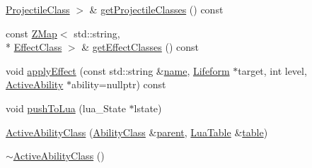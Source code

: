 \begin{DoxyCompactItemize}
\hyperlink{classZeta_1_1ProjectileClass}{Projectile\+Class} $>$ \& \hyperlink{classZeta_1_1ActiveAbilityClass_ada3442d70e784a20c2ce9a19df2c0cb2}{get\+Projectile\+Classes} () const 
\item 
const \hyperlink{namespaceZeta_a9af2e12c4e432d2a1725f19e5a648a04}{Z\+Map}$<$ std\+::string, \\*
\hyperlink{classZeta_1_1EffectClass}{Effect\+Class} $>$ \& \hyperlink{classZeta_1_1ActiveAbilityClass_a5adaf78b13d013b38004f72c3b90bc5f}{get\+Effect\+Classes} () const 
\item 
void \hyperlink{classZeta_1_1ActiveAbilityClass_ad4916e9a102c5300d1eddb1723fd0298}{apply\+Effect} (const std\+::string \&\hyperlink{classZeta_1_1Resource_a44c5721216f4beb31c0b3d2ef2aecf1d}{name}, \hyperlink{classZeta_1_1Lifeform}{Lifeform} $\ast$target, int level, \hyperlink{classZeta_1_1ActiveAbility}{Active\+Ability} $\ast$ability=nullptr) const 
\item 
void \hyperlink{classZeta_1_1ActiveAbilityClass_aee8c5ff9d2858223e36758a36058cbe9}{push\+To\+Lua} (lua\+\_\+\+State $\ast$lstate)
\item 
\hyperlink{classZeta_1_1ActiveAbilityClass_ab1c8e4fd674f08755a3312eaa3f7ef8a}{Active\+Ability\+Class} (\hyperlink{classZeta_1_1AbilityClass}{Ability\+Class} \&\hyperlink{classZeta_1_1AbilityClass_ad862e9ba14d23afb20786a1eeb2ca872}{parent}, \hyperlink{classZeta_1_1LuaTable}{Lua\+Table} \&\hyperlink{classZeta_1_1AbilityClass_a58065ca9d19ff9366c09bfc8d81abbac}{table})
\item 
\hyperlink{classZeta_1_1ActiveAbilityClass_afb0d7c65437fbab71a9047562048ae8f}{$\sim$\+Active\+Ability\+Class} ()
\end{DoxyCompactItemize}
